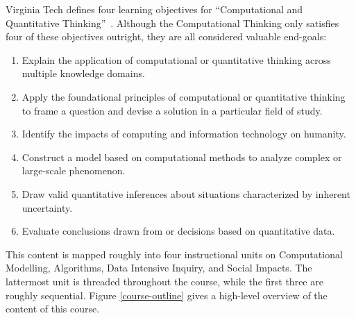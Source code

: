 Virginia Tech defines four learning objectives for ``Computational and Quantitative Thinking''~\cite{vt-vision}. Although the Computational Thinking only satisfies four of these objectives outright, they are all considered valuable end-goals:
\begin{enumerate}
	\item Explain the application of computational or quantitative thinking across multiple knowledge domains.
	\item Apply the foundational principles of computational or quantitative thinking to frame a question and devise a solution in a particular field of study.
	\item Identify the impacts of computing and information technology on humanity.
	\item Construct a model based on computational methods to analyze complex or large-scale phenomenon.
	\item Draw valid quantitative inferences about situations characterized by inherent uncertainty.
	\item Evaluate conclusions drawn from or decisions based on quantitative data.
\end{enumerate}

This content is mapped roughly into four instructional units on Computational Modelling, Algorithms, Data Intensive Inquiry, and Social Impacts. The lattermost unit is threaded throughout the course, while the first three are roughly sequential. Figure \ref{course-outline} gives a high-level overview of the content of this course.

